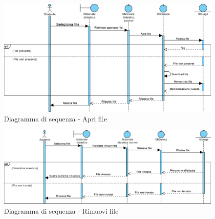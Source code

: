 \begin{figure}
	\centering
	\includegraphics[width=6.5in]{imgs/gruppo1/sequence_diagrams/SD16_apri_file.pdf}
	\caption{Diagramma di sequenza - Apri file}
	\label{diag:apriFileSD}
\end{figure}
\newpage

\begin{figure}
	\centering
	\includegraphics[width=6.5in]{imgs/gruppo1/sequence_diagrams/SD17_rimuovi_file.pdf}
	\caption{Diagramma di sequenza - Rimuovi file}
	\label{diag:rimuoviFileSD}
\end{figure}

\clearpage
